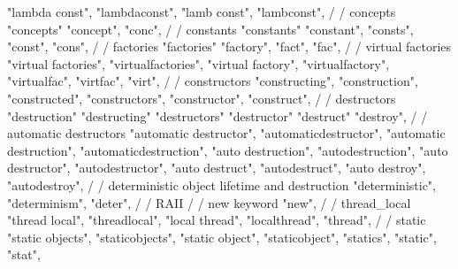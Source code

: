         "lambda const",
        "lambdaconst",
        "lamb const",
        "lambconst",
        /
        / concepts 
        "concepts"
        "concept",
        "conc",
        /
        / constants 
        "constants"
        "constant",
        "consts",
        "const", 
        "cons",
        /
        / factories 
        "factories"
        "factory",
        "fact",
        "fac",
        /
        / virtual factories 
        "virtual factories",  
        "virtualfactories",  
        "virtual factory",  
        "virtualfactory",  
        "virtualfac",  
        "virtfac",  
        "virt",  
        /
        / constructors 
        "constructing",
        "construction",
        "constructed",
        "constructors",
        "constructor",
        "construct",
        /
        / destructors
        "destruction" 
        "destructing" 
        "destructors" 
        "destructor" 
        "destruct" 
        "destroy", 
        /
        / automatic destructors 
        "automatic destructor",  
        "automaticdestructor",  
        "automatic destruction", 
        "automaticdestruction", 
        "auto destruction",  
        "autodestruction",  
        "auto destructor",  
        "autodestructor",  
        "auto destruct",  
        "autodestruct",  
        "auto destroy",  
        "autodestroy",  
        /
        / deterministic object lifetime and destruction
        "deterministic",  
        "determinism",  
        "deter",  
        /
        / RAII 
        /
        / new keyword 
        "new",
        /
        / thread_local
        "thread local",
        "threadlocal",
        "local thread",
        "localthread",
        "thread",
        /
        / static 
        "static objects",
        "staticobjects",
        "static object",
        "staticobject",
        "statics",
        "static",
        "stat", 
        
